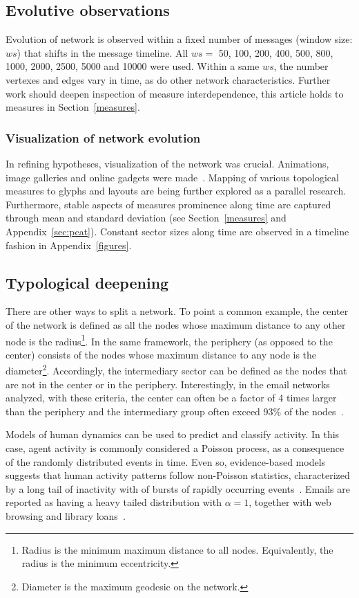 \documentclass[%
 aip,
 jmp,%
 amsmath,amssymb,
 reprint,%
]{revtex4-1}
\begin{document}
   \subsection{Evolutive observations}
Evolution of network is observed within a fixed number of messages (window size: $ws$) that shifts in the message timeline.
 All $ws=$ 50, 100, 200, 400, 500, 800, 1000, 2000, 2500, 5000 and 10000 were used. Within a same $ws$, the number vertexes and edges vary in time, as do other network characteristics. Further work should deepen inspection of measure interdependence, this article holds to measures in Section~\ref{measures}.

        \subsubsection*{Visualization of network evolution}
In refining hypotheses, visualization of the network was crucial. Animations, image galleries and online gadgets were made~\cite{animacoes,galGMANE,appGMANE}. Mapping of various topological measures to glyphs and layouts are being further explored as a parallel research. Furthermore, stable aspects of measures prominence along time are captured through mean and standard deviation (see Section~\ref{measures} and Appendix~\ref{sec:pcat}). Constant sector sizes along time are observed in a timeline fashion in Appendix~\ref{figures}.


    \subsection{Typological deepening}
There are other ways to split a network. To point a common example, the center of the network is defined as all the nodes whose maximum distance to any other node is the radius\footnote{Radius is the minimum maximum distance to all nodes. Equivalently, the radius is the minimum eccentricity.}. 
In the same framework, the periphery (as opposed to the center) consists of the nodes whose maximum distance to any node is the diameter\footnote{Diameter is the maximum geodesic on the network.}. Accordingly, the intermediary sector can be defined as the nodes that are not in the center or in the periphery. Interestingly, in the email networks analyzed, with these criteria, the center can often be a factor of 4 times larger than the periphery and the intermediary group often exceed 93\% of the nodes~\cite{networkx}.

Models of human dynamics can be used to predict and classify activity. In this case, agent activity is commonly considered a Poisson process, as a consequence of the randomly distributed events in time. Even so, evidence-based models suggests that human activity patterns follow non-Poisson statistics, characterized by a long tail of inactivity with of bursts of rapidly occurring events~\cite{barabasiHumanDyn,barabasiPhone}. Emails are reported as having a heavy tailed distribution with $\alpha=1$, together with web browsing and library loans~\cite{barabasiHumanDyn}.
\end{document}
